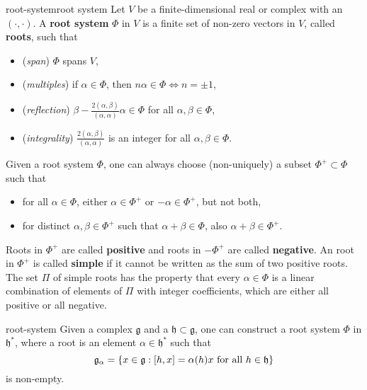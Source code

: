 \begin{topic}{root-system}{root system}
    Let $V$ be a finite-dimensional real or complex  with an  $(\cdot, \cdot)$. A \textbf{root system} $\Phi$ in $V$ is a finite set of non-zero vectors in $V$, called \textbf{roots}, such that
    \begin{itemize}
        \item (\textit{span}) $\Phi$ spans $V$,
        \item (\textit{multiples}) if $\alpha \in \Phi$, then $n \alpha \in \Phi \iff n = \pm 1$,
        \item (\textit{reflection}) $\beta - \frac{2 (\alpha, \beta)}{(\alpha, \alpha)} \alpha \in \Phi$ for all $\alpha, \beta \in \Phi$,
        \item (\textit{integrality}) $\frac{2 (\alpha, \beta)}{(\alpha, \alpha)}$ is an integer for all $\alpha, \beta \in \Phi$.
    \end{itemize}
    Given a root system $\Phi$, one can always choose (non-uniquely) a subset $\Phi^+ \subset \Phi$ such that
    \begin{itemize}
        \item for all $\alpha \in \Phi$, either $\alpha \in \Phi^+$ or $-\alpha \in \Phi^+$, but not both,
        \item for distinct $\alpha, \beta \in \Phi^+$ such that $\alpha + \beta \in \Phi$, also $\alpha + \beta \in \Phi^+$.
    \end{itemize}
    Roots in $\Phi^+$ are called \textbf{positive} and roots in $-\Phi^+$ are called \textbf{negative}. An root in $\Phi^+$ is called \textbf{simple} if it cannot be written as the sum of two positive roots. The set $\Pi$ of simple roots has the property that every $\alpha \in \Phi$ is a linear combination of elements of $\Pi$ with integer coefficients, which are either all positive or all negative.
\end{topic}

\begin{example}{root-system}
    Given a complex  $\mathfrak{g}$ and a  $\mathfrak{h} \subset \mathfrak{g}$, one can construct a root system $\Phi$ in $\mathfrak{h}^*$, where a root is an element $\alpha \in \mathfrak{h}^*$ such that
    \[ \mathfrak{g}_\alpha = \{ x \in \mathfrak{g} : [h, x] = \alpha(h) x \textup{ for all } h \in \mathfrak{h} \} \]
    is non-empty.
\end{example}


